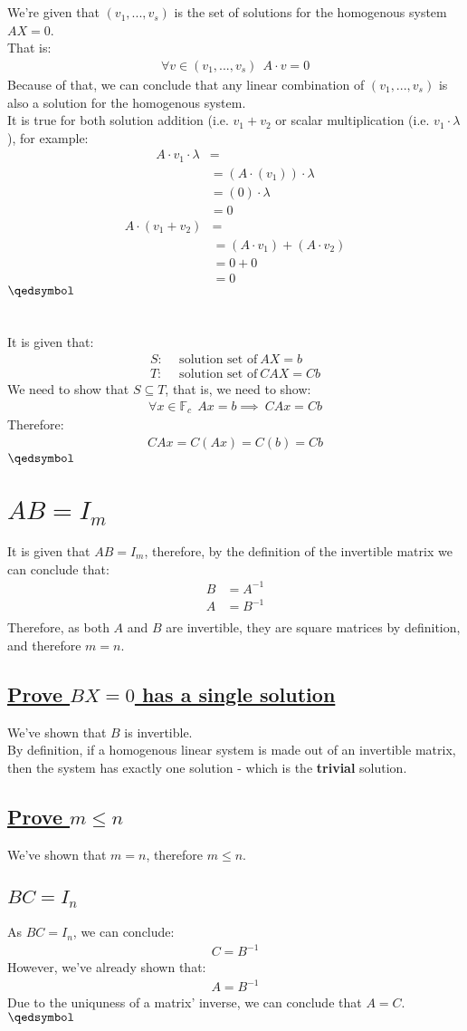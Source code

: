 \documentclass[a4paper, 12pt]{article}
\newcommand{\sub}[1]{\subsection{\underline{#1}}}
\newcommand{\F}{\ensuremath{\mathbb{F}}}
\newcommand{\eq}[1]{\begin{align*}#1\end{align*}}
\renewcommand{\qed}{\hfill\(\qedsymbol\)}
\begin{document}
\section{}
We're given that $(v_1,...,v_s)$ is the set of solutions for the homogenous system $AX=0$.\\
That is:
\eq{
    \forall{v}\in{(v_1,...,v_s)}~~A\cdot{v}=0
}
Because of that, we can conclude that any linear combination of $(v_1,...,v_s)$ is also a solution for the homogenous system.\\
It is true for both solution addition (i.e. $v_1+v_2$ or scalar multiplication (i.e. $v_1\cdot\lambda$), for example:
\eq{
    A\cdot{v_1}\cdot\lambda&=\\
    &=(A\cdot(v_1))\cdot\lambda\\
    &=(0)\cdot\lambda\\
    &=0
}
\eq{
    A\cdot{(v_1+v_2)}&=\\
    &=(A\cdot{v_1})+(A\cdot{v_2})\\
    &=0+0\\
    &=0
}
\qed

\section{}
It is given that:
\eq{
    S:~~&\text{solution set of}~AX=b\\
    T:~~&\text{solution set of}~CAX=Cb
}
We need to show that $S\subseteq{T}$, that is, we need to show:
\eq{
    \forall{x\in\F_c}~~Ax=b\implies~CAx=Cb
}
Therefore:
\eq{
    CAx=C(Ax)=C(b)=Cb
}
\qed
\pagebreak

\setcounter{section}{16}
\section{$AB=I_m$}
It is given that $AB=I_m$, therefore, by the definition of the invertible matrix we can conclude that:
\eq{
    B&=A^{-1}\\
    A&=B^{-1}\\
}
Therefore, as both $A$ and $B$ are invertible, they are square matrices by definition, and therefore $m=n$.\\
\sub{Prove $BX=0$ has a single solution}
We've shown that $B$ is invertible.\\
By definition, if a homogenous linear system is made out of an invertible matrix, then the system has exactly one solution - which is the \textbf{trivial} solution.
\sub{Prove $m\leq{n}$}
We've shown that $m=n$, therefore $m\leq{n}$.
\sub{$BC=I_n$}
As $BC=I_n$, we can conclude:
\eq{
    C=B^{-1}
}
However, we've already shown that:
\eq{
    A=B^{-1}
}
Due to the uniquness of a matrix' inverse, we can conclude that $A=C$.
\qed

\end{document}
